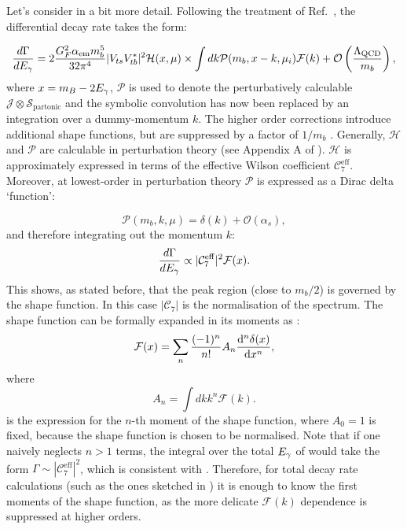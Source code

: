 Let's consider  in a bit more detail.
Following the treatment of Ref.~\cite{Ligeti:2008ac}, the differential decay rate takes the form:

\begin{equation}\label{eq:differential_decay_simba}
    \frac{d\Gamma}{dE_{\gamma}} = 2\frac{G_F^2\alpha_{\mathrm{em}} m_b^5}{32\pi^4}|V_{ts}V_{tb}^*|^2 \mathcal{H}(x, \mu) \times \int dk \mathcal{P}(m_b, x - k, \mu_i) \mathcal{F}(k) + {\cal O}\left(\frac{\Lambda_{\mathrm{QCD}}}{m_b}\right),
\end{equation}
where $x=m_B-2{E_{\gamma}}$, $\mathcal{P}$ is used to denote the perturbatively calculable $\mathcal{J}\otimes\mathcal{S_{\mathrm{partonic}}}$ and the symbolic convolution has now been replaced by an integration over a dummy-momentum $k$.
The higher order corrections introduce additional shape functions, but are suppressed by a factor of $1/m_b$ \cite{Neubert:2002yx}.
Generally, $\mathcal{H}$ and $\mathcal{P}$ are calculable in perturbation theory (see Appendix A of \cite{Ligeti:2008ac}).
$\mathcal{H}$ is approximately expressed in terms of the effective Wilson coefficient $\mathcal{C}_7^{\mathrm{eff}}$. 
Moreover, at lowest-order in perturbation theory $\mathcal{P}$ is expressed as a Dirac delta `function':

\begin{equation}
    \mathcal{P}(m_b,k,\mu) = \delta(k) + \mathcal{O}(\alpha_s),
\end{equation}
and therefore integrating out the momentum $k$:
\begin{equation}\label{eq:integrated_egamma}
    \frac{d\Gamma}{d{E_{\gamma}}} \propto |\mathcal{C}_7^{\mathrm{eff}}|^2 \mathcal{F}(x).
\end{equation}
This shows, as stated before, that the peak region (close to $m_b/2$) is governed by the shape function.
In this case $|\mathcal{C}_7|$ is the normalisation of the spectrum.
The shape function can be formally expanded in its moments as \cite{PhysRevD.50.2037,Ligeti:2008ac}:
\begin{equation}\label{eq:shape_function_expansion}
    \mathcal{F}(x) = \sum_n \frac{(-1)^n}{n!} A_n \dv[n]{\delta(x)}{x},
\end{equation}
where 
\begin{equation}\label{eq:moments_of_shape_function}
    A_n = \int dk k^n \mathcal{F}(k).
\end{equation}
 is the expression for the $n$-th moment of the shape function, where 
$A_0=1$ is fixed, because the shape function is chosen to be normalised.
Note that if one naively neglects $n>1$ terms, the integral over the total ${E_{\gamma}}$ of  would take the form $\Gamma\sim|\mathcal{C}_7^{\mathrm{eff}}|^2$, which is consistent with .
Therefore, for total decay rate calculations (such as the ones sketched in ) it is enough to know the first moments of the shape function, as the more delicate $\mathcal{F}(k)$ dependence is suppressed at higher orders.

